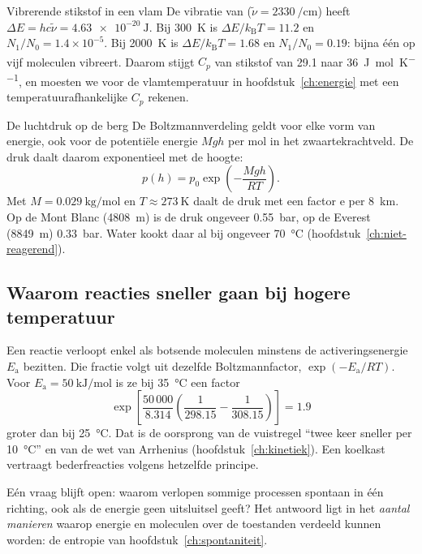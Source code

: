 \begin{voorbeeld}{Vibrerende stikstof in een vlam}
De vibratie van  ($\tilde\nu = \SI{2330}{\per\centi\metre}$) heeft $\Delta E = hc\tilde\nu = \SI{4.63e-20}{\joule}$. Bij \SI{300}{\kelvin} is $\Delta E/k_\mathrm{B}T = 11.2$ en $N_1/N_0 = 1.4\times10^{-5}$. Bij \SI{2000}{\kelvin} is $\Delta E/k_\mathrm{B}T = 1.68$ en $N_1/N_0 = 0.19$: bijna één op vijf moleculen vibreert. Daarom stijgt $C_p$ van stikstof van \SI{29.1}{} naar \SI{36}{\joule\per\mole\per\kelvin}, en moesten we voor de vlamtemperatuur in hoofdstuk~\ref{ch:energie} met een temperatuurafhankelijke $C_p$ rekenen.
\end{voorbeeld}

\begin{toepassing}{De luchtdruk op de berg}
De Boltzmannverdeling geldt voor elke vorm van energie, ook voor de potentiële energie $Mgh$ per mol in het zwaartekrachtveld. De druk daalt daarom exponentieel met de hoogte:
\begin{equation}
p(h) = p_0 \exp\!\left(-\frac{Mgh}{RT}\right).
\end{equation}
Met $M = \SI{0.029}{\kilo\gram\per\mole}$ en $T \approx \SI{273}{\kelvin}$ daalt de druk met een factor $\mathrm{e}$ per \SI{8}{\kilo\metre}. Op de Mont Blanc (\SI{4808}{\metre}) is de druk ongeveer \SI{0.55}{\bar}, op de Everest (\SI{8849}{\metre}) \SI{0.33}{\bar}. Water kookt daar al bij ongeveer \SI{70}{\celsius} (hoofdstuk~\ref{ch:niet-reagerend}).
\end{toepassing}

\subsection{Waarom reacties sneller gaan bij hogere temperatuur}

Een reactie verloopt enkel als botsende moleculen minstens de activeringsenergie $E_\mathrm{a}$ bezitten. Die fractie volgt uit dezelfde Boltzmannfactor, $\exp(-E_\mathrm{a}/RT)$. Voor $E_\mathrm{a} = \SI{50}{\kilo\joule\per\mole}$ is ze bij \SI{35}{\celsius} een factor
\[
\exp\!\left[\frac{50\,000}{8.314}\left(\frac{1}{298.15} - \frac{1}{308.15}\right)\right] = 1.9
\]
groter dan bij \SI{25}{\celsius}. Dat is de oorsprong van de vuistregel ``twee keer sneller per \SI{10}{\celsius}'' en van de wet van Arrhenius (hoofdstuk~\ref{ch:kinetiek}). Een koelkast vertraagt bederfreacties volgens hetzelfde principe.

Eén vraag blijft open: waarom verlopen sommige processen spontaan in één richting, ook als de energie geen uitsluitsel geeft? Het antwoord ligt in het \emph{aantal manieren} waarop energie en moleculen over de toestanden verdeeld kunnen worden: de entropie van hoofdstuk~\ref{ch:spontaniteit}.

